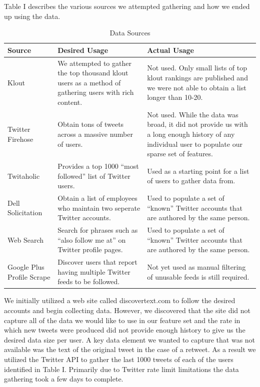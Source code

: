 \documentclass[10pt, conference, compsocconf]{IEEEtran}
\begin{document}
Table I describes the various sources we attempted gathering and how we ended up using the data.
\begin{table}[!h]
  \centering
  \begin{tabularx}{\linewidth}{X X X}
    \toprule
    \bf{Source} & \bf{Desired Usage} & \bf{Actual Usage} \\ \midrule
    Klout & We attempted to gather the top thousand klout users as a method of gathering users with rich content. & Not used. Only small lists of top klout rankings are published and we were not able to obtain a list longer than 10-20. \\ \midrule
    Twitter Firehose & Obtain tons of tweets across a massive number of users. & Not used. While the data was broad, it did not provide us with a long enough history of any individual user to populate our sparse set of features. \\ \midrule
    Twitaholic & Provides a top 1000 “most followed” list of Twitter users. & Used as a starting point for a list of users to gather data from. \\ \midrule
    Dell Solicitation & Obtain a list of employees who maintain two seperate Twitter accounts. & Used to populate a set of “known” Twitter accounts that are authored by the same person. \\ \midrule
    Web Search & Search for phrases such as “also follow me at” on Twitter profile pages. & Used to populate a set of “known” Twitter accounts that are authored by the same person. \\ \midrule
    Google Plus Profile Scrape & Discover users that report having multiple Twitter feeds to be followed. & Not yet used as manual filtering of unusable feeds is still required. \\
    \bottomrule
  \end{tabularx}
  \caption{Data Sources}
\end{table}
We initially utilized a web site called discovertext.com to follow the
desired accounts and begin collecting data. However, we discovered
that the site did not capture all of the data we would like to use in
our feature set and the rate in which new tweets were produced did not
provide enough history to give us the desired data size per user. A
key data element we wanted to capture that was not available was the
text of the original tweet in the case of a retweet. As a result we
utilized the Twitter API to gather the last 1000 tweets of each of the
users identified in Table I. Primarily due to Twitter rate limit
limitations the data gathering took a few days to complete.
\end{document}
